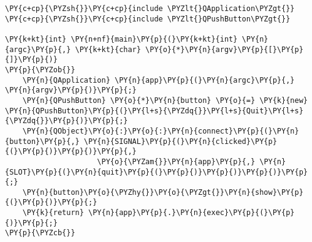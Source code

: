 \begin{Verbatim}[commandchars=\\\{\}]
\PY{c+cp}{\PYZsh{}}\PY{c+cp}{include \PYZlt{}QApplication\PYZgt{}}
\PY{c+cp}{\PYZsh{}}\PY{c+cp}{include \PYZlt{}QPushButton\PYZgt{}}

\PY{k+kt}{int} \PY{n+nf}{main}\PY{p}{(}\PY{k+kt}{int} \PY{n}{argc}\PY{p}{,} \PY{k+kt}{char} \PY{o}{*}\PY{n}{argv}\PY{p}{[}\PY{p}{]}\PY{p}{)}
\PY{p}{\PYZob{}}
    \PY{n}{QApplication} \PY{n}{app}\PY{p}{(}\PY{n}{argc}\PY{p}{,} \PY{n}{argv}\PY{p}{)}\PY{p}{;}
    \PY{n}{QPushButton} \PY{o}{*}\PY{n}{button} \PY{o}{=} \PY{k}{new} \PY{n}{QPushButton}\PY{p}{(}\PY{l+s}{\PYZdq{}}\PY{l+s}{Quit}\PY{l+s}{\PYZdq{}}\PY{p}{)}\PY{p}{;}
    \PY{n}{QObject}\PY{o}{:}\PY{o}{:}\PY{n}{connect}\PY{p}{(}\PY{n}{button}\PY{p}{,} \PY{n}{SIGNAL}\PY{p}{(}\PY{n}{clicked}\PY{p}{(}\PY{p}{)}\PY{p}{)}\PY{p}{,}
                     \PY{o}{\PYZam{}}\PY{n}{app}\PY{p}{,} \PY{n}{SLOT}\PY{p}{(}\PY{n}{quit}\PY{p}{(}\PY{p}{)}\PY{p}{)}\PY{p}{)}\PY{p}{;}
    \PY{n}{button}\PY{o}{\PYZhy{}}\PY{o}{\PYZgt{}}\PY{n}{show}\PY{p}{(}\PY{p}{)}\PY{p}{;}
    \PY{k}{return} \PY{n}{app}\PY{p}{.}\PY{n}{exec}\PY{p}{(}\PY{p}{)}\PY{p}{;}
\PY{p}{\PYZcb{}}
\end{Verbatim}
